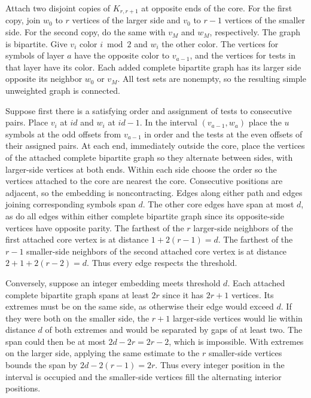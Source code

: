 \documentclass[11pt]{article}
\begin{document}
Attach two disjoint copies of $K_{r,r+1}$ at opposite ends of the core. For the first copy, join $w_0$ to $r$ vertices of the larger side and $v_0$ to $r-1$ vertices of the smaller side. For the second copy, do the same with $v_M$ and $w_M$, respectively. The graph is bipartite. Give $v_i$ color $i\bmod 2$ and $w_i$ the other color. The vertices for symbols of layer $a$ have the opposite color to $v_{a-1}$, and the vertices for tests in that layer have its color. Each added complete bipartite graph has its larger side opposite its neighbor $w_0$ or $v_M$. All test sets are nonempty, so the resulting simple unweighted graph is connected.

Suppose first there is a satisfying order and assignment of tests to consecutive pairs. Place $v_i$ at $id$ and $w_i$ at $id-1$. In the interval $(v_{a-1},w_a)$ place the $u$ symbols at the odd offsets from $v_{a-1}$ in order and the tests at the even offsets of their assigned pairs. At each end, immediately outside the core, place the vertices of the attached complete bipartite graph so they alternate between sides, with larger-side vertices at both ends. Within each side choose the order so the vertices attached to the core are nearest the core. Consecutive positions are adjacent, so the embedding is noncontracting. Edges along either path and edges joining corresponding symbols span $d$. The other core edges have span at most $d$, as do all edges within either complete bipartite graph since its opposite-side vertices have opposite parity. The farthest of the $r$ larger-side neighbors of the first attached core vertex is at distance $1+2(r-1)=d$. The farthest of the $r-1$ smaller-side neighbors of the second attached core vertex is at distance $2+1+2(r-2)=d$. Thus every edge respects the threshold.

Conversely, suppose an integer embedding meets threshold $d$. Each attached complete bipartite graph spans at least $2r$ since it has $2r+1$ vertices. Its extremes must be on the same side, as otherwise their edge would exceed $d$. If they were both on the smaller side, the $r+1$ larger-side vertices would lie within distance $d$ of both extremes and would be separated by gaps of at least two. The span could then be at most $2d-2r=2r-2$, which is impossible. With extremes on the larger side, applying the same estimate to the $r$ smaller-side vertices bounds the span by $2d-2(r-1)=2r$. Thus every integer position in the interval is occupied and the smaller-side vertices fill the alternating interior positions.
\end{document}
